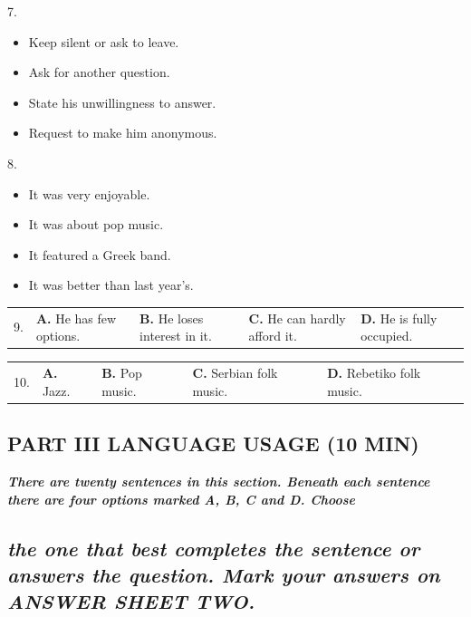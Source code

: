 \documentclass[UTF8,11pt]{ctexart}
\begin{document}
7.


\begin{itemize}[leftmargin=2em,itemsep=.2em,topsep=.4em]\item[A.] Keep silent or ask to leave.
\item[B.] Ask for another question.
\item[C.] State his unwillingness to answer.
\item[D.] Request to make him anonymous.
\end{itemize}

8.


\begin{itemize}[leftmargin=2em,itemsep=.2em,topsep=.4em]\item[A.] It was very enjoyable.
\item[B.] It was about pop music.
\item[C.] It featured a Greek band.
\item[D.] It was better than last year’s.
\end{itemize}

\noindent\begin{tabularx}{\linewidth}{@{}lXXXX@{}}9. & \textbf{A.} He has few options. & \textbf{B.} He loses interest in it. & \textbf{C.} He can hardly afford it. & \textbf{D.} He is fully occupied.\\\end{tabularx}\par

\noindent\begin{tabularx}{\linewidth}{@{}lXXXX@{}}10. & \textbf{A.} Jazz. & \textbf{B.} Pop music. & \textbf{C.} Serbian folk music. & \textbf{D.} Rebetiko folk music.\\\end{tabularx}\par

\subsection*{\textbf{PART} \textbf{III LANGUAGE USAGE (10 MIN)}}


\textbf{\textit{There are twenty sentences in this section. Beneath each sentence there are four options marked A, B, C and D. Choose}}


\subsection*{\textbf{\textit{the one that best completes the sentence or answers the question. Mark your answers on ANSWER SHEET TWO.}}}
\end{document}
